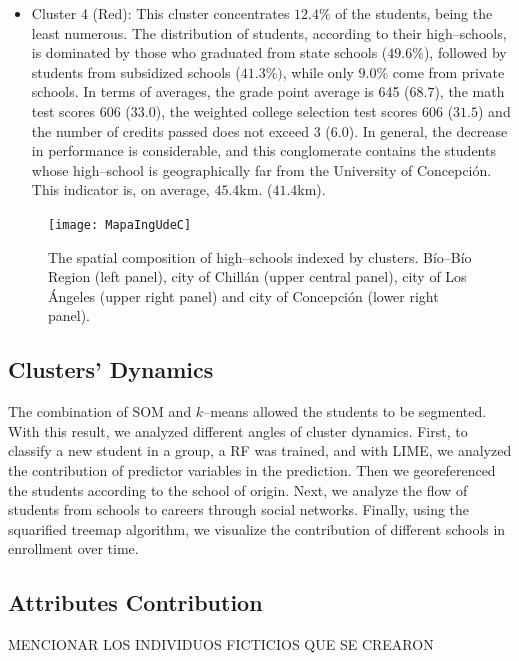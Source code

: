 \documentclass[5p,authoryear,preprint,12pt]{elsarticle}
\begin{document}
\begin{itemize}
	\vspace{0.5cm}
	\item Cluster 4 (Red): This cluster concentrates $12.4\%$ of the students, being the least numerous. The distribution of students, according to their high--schools, is dominated by those who graduated from state schools ($49.6\%$), followed by students from subsidized schools ($41.3\%)$, while only $9.0\%$ come from private schools. In terms of averages, the grade point average is 645 ($68.7$), the math test scores 606 ($33.0$), the weighted college selection test scores 606 ($31.5$) and the number of credits passed does not exceed 3 ($6.0$). In general, the decrease in performance is considerable, and this conglomerate contains the students whose high--school is geographically far from the University of Concepción. This indicator is, on average, $45.4$\si{\km}. ($41.4$\si{km}).
\end{itemize}

\begin{figure}[htb]
	\centering
	\texttt{[image: MapaIngUdeC]}
	\caption{The spatial composition of high--schools indexed by clusters. B\'io--B\'io Region (left panel), city of Chillán (upper central panel), city of Los Ángeles (upper right panel) and city of Concepción (lower right panel).}
	\label{map}
\end{figure}

%
\subsection{Clusters' Dynamics}

The combination of SOM and $k$--means allowed the students to be segmented. With this result, we analyzed different angles of cluster dynamics. First, to classify a new student in a group, a RF was trained, and with LIME, we analyzed the contribution of predictor variables in the prediction. Then we georeferenced the students according to the school of origin.  Next, we analyze the flow of students from schools to careers through social networks. Finally, using the squarified treemap algorithm, we visualize the contribution of different schools in enrollment over time.  

\subsection{Attributes Contribution}
MENCIONAR LOS INDIVIDUOS FICTICIOS QUE SE CREARON
\end{document}
